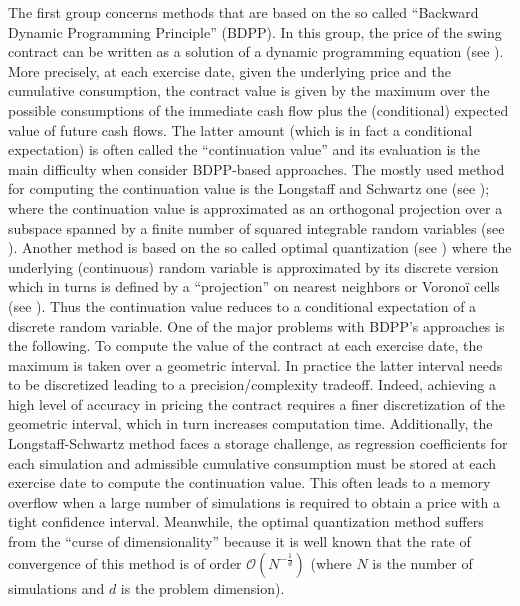 \documentclass{article}
\newcommand{\q}[1]{``#1''}
\renewcommand{\q}[1]{``#1''}
\numberwithin{equation}{section}
\begin{document}
The first group concerns methods that are based on the so called \q{Backward Dynamic Programming Principle} (BDPP). In this group, the price of the swing contract can be written as a solution of a dynamic programming equation (see \cite{Bardou2007WhenAS, Bardou2009OptimalQF, BarreraEsteve2006NumericalMF,Jaillet2004ValuationOC, LariLavassani2002ADV,Thompson1995ValuationOP}). More precisely, at each exercise date, given the underlying price and the cumulative consumption, the contract value is given by the maximum over the possible consumptions of the immediate cash flow plus the (conditional) expected value of future cash flows. The latter amount (which is in fact a conditional expectation) is often called the \q{continuation value} and its evaluation is the main difficulty when consider BDPP-based approaches. The mostly used method for computing the continuation value is the Longstaff and Schwartz one (see \cite{Longstaff2001ValuingAO}); where the continuation value is approximated as an orthogonal projection over a subspace spanned by a finite number of squared integrable random variables (see \cite{BarreraEsteve2006NumericalMF, Longstaff2001ValuingAO}). Another method is based on the so called optimal quantization (see \cite{Pags2004OptimalQM}) where the underlying (continuous) random variable is approximated by its discrete version which in turns is defined by a \q{projection} on nearest neighbors or Voronoï cells (see \cite{Bardou2009OptimalQF}). Thus the continuation value reduces to a conditional expectation of a discrete random variable. One of the major problems with BDPP's approaches is the following. To compute the value of the contract at each exercise date, the maximum is taken over a geometric interval. In practice the latter interval needs to be discretized leading to a precision/complexity tradeoff. Indeed, achieving a high level of accuracy in pricing the contract requires a finer discretization of the geometric interval, which in turn increases computation time. Additionally, the Longstaff-Schwartz method faces a storage challenge, as regression coefficients for each simulation and admissible cumulative consumption must be stored at each exercise date to compute the continuation value. This often leads to a memory overflow when a large number of simulations is required to obtain a price with a tight confidence interval. Meanwhile, the optimal quantization method suffers from the \q{curse of dimensionality} because it is well known that the rate of convergence of this method is of order $\mathcal{O}(N^{-\frac{1}{d}})$ (where $N$ is the number of simulations and $d$ is the problem dimension).
\end{document}

